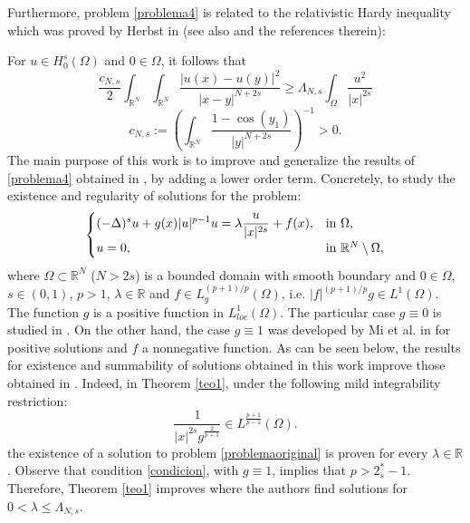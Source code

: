 \documentclass[preprint,12pt]{elsarticle}
\begin{document}
		Furthermore, problem  \eqref{problema4}  is related to the relativistic Hardy inequality which was proved by Herbst in \cite{Her} (see also \cite{Barrios} and the references therein):
		
		For $u\in H^s_0(\Omega)$ and $0\in \Omega$,  it follows that
		\begin{equation}\label{DesigualdadHardy}
			\frac{c_{N,s}}{2}\int_{\mathbb{R}^N}\int_{\mathbb{R}^N} \frac{|u(x)-u(y)|^2}{|x-y|^{N+2s}}\geq \Lambda_{N,s}\int_{\Omega} \frac{u^2}{|x|^{2s}}
		\end{equation}		
		$$c_{N,s}:=\left(\displaystyle \int_{\mathbb{R}^N}\frac{1-\cos{(y_1)}}{|y|^{N+2s}}\right)^{-1}>0.$$
		The main purpose of this work is to improve and generalize the results of \eqref{problema4} obtained in \cite{Ireneo},  by adding a lower order term. Concretely, to study the existence and regularity of solutions for the problem:
		\begin{equation}\label{problemaoriginal}
			\begin{cases}
				\displaystyle(-\Delta)^s u+ g(x)|u|^{p-1}u= \lambda \frac{u}{|x|^{2s}}+f(x), &  \text{in $\Omega$,}\\
				\mathnormal{u}=0, & \text{in $\mathbb{R}^N\setminus\Omega$,}
			\end{cases}
		\end{equation}
		where $\Omega\subset \mathbb{R}^N$ ($N>2s$) is a bounded domain with smooth boundary and $0\in \Omega$, $s\in (0,1)$, $p>1$, $\lambda\in \mathbb{R}$ and $f\in L^{(p+1)/p}_g(\Omega)$, i.e. $|f|^{(p+1)/p}g\in L^1(\Omega)$. The function $g$ is a positive function in $L_{loc}^1(\Omega)$. The particular case $g\equiv 0$ is studied in \cite{Ireneo}. On the other hand, the case $g\equiv 1$ was developed by Mi et al. in \cite{Mi} for positive solutions and $f$ a nonnegative function. As can be seen below, the results for existence and summability of solutions obtained in this work improve those obtained in \cite{Mi}. Indeed, in Theorem \ref{teo1}, under the following mild integrability restriction:
		\begin{equation}\label{condicion}
			\frac{1}{|x|^{2s}g^{\frac{2}{p+1}}}\in L^{\frac{p+1}{p-1}}(\Omega).
		\end{equation}
		the existence of a solution to problem \eqref{problemaoriginal} is proven for every $\lambda \in \mathbb{R}$. Observe that condition \eqref{condicion}, with $g\equiv 1$, implies that $p>2^*_{s}-1$. Therefore, Theorem \ref{teo1} improves  \cite[Theorem 1.4]{Mi} where the authors find solutions for ${0<\lambda\leq\Lambda_{N,s}}$.
		
\end{document}
